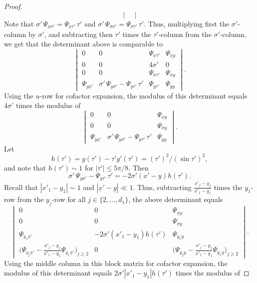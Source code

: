 \documentclass[leqno]{amsart}
\theoremstyle{definition}
\theoremstyle{remark}
\numberwithin{equation}{section}
\begin{document}
\begin{proof}
\[\begin{vmatrix}
\end{vmatrix}
\]
Note that $\sigma' \, \Psi_{\underline x\sigma'} = 
\Psi_{\underline x\tau'} \, \tau'$ and $\sigma' \, \Psi_{\sigma\sigma'} = 
\Psi_{\sigma\tau'} \, \tau'$.
Thus, multiplying first the $\sigma'$-column by $\sigma'$, and subtracting then $\tau'$ times the $\tau'$-column from the $\sigma'$-column, we get that the determinant above is comparable to
\[
\begin{vmatrix}
0 & 0 & \Psi_{\underline x\tau'} & \Psi_{\underline xy} \\
0 & 0 & 4 \sigma' & 0 \\
0 & 0 & \Psi_{\sigma \tau'} & \Psi_{\sigma y} \\
\Psi_{y\underline x'} & \sigma' \, \Psi_{y\sigma'} -\Psi_{y \tau'} \, \tau'& \Psi_{y \tau'} & \Psi_{y y}
\end{vmatrix}.
\]
Using the $u$-row for cofactor expansion, the modulus of this determinant equals $ 4 \sigma'$ times the modulus of
\[
\begin{vmatrix}
0 & 0 & \Psi_{\underline xy} \\
0 & 0 & \Psi_{\sigma y} \\
\Psi_{y\underline x'} & \sigma' \, \Psi_{y\sigma'} -\Psi_{y \tau'} \, \tau' & \Psi_{y y}
\end{vmatrix}.
\]
 Let 
 \begin{equation}\label{htau}
h(\tau') = g(\tau')-\tau' g'(\tau')=(\tau')^2/(\sin \tau')^2,
\end{equation}  
and note that $h(\tau')\sim 1$ for $|\tau'|\le 5\pi/8.$   Then
\[
\sigma' \, \Psi_{y\sigma'} -\Psi_{y \tau'} \, \tau'
 = -2\sigma'\left(x'-y\right)h(\tau').
\]
Recall that $|x'_1-y_1|\sim 1$ and $|\underline x'-\underline y|\ll 1$. Thus, subtracting $\tfrac{x'_j-y_j}{x'_1-y_1}$ times the $y_1$-row from the $y_j$-row for all $j\in \{2,\dots,d_1\}$, the above determinant equals
\[
\begin{vmatrix}
0 & 0 & \Psi_{\underline xy} \\
0 & 0 & \Psi_{\sigma y} \\
\Psi_{y_1\underline x'} & -2\sigma'\left(x'_1-y_1\right)h(\tau') & \Psi_{y_1 y} \\
\big(\Psi_{y_j\underline x'} -\tfrac{x'_j-y_j}{x'_1-y_1}\Psi_{y_1\underline x'}\big)_{j\ge 2} & 0 & \big(\Psi_{y_j y} -\tfrac{x'_j-y_j}{x'_1-y_1}\Psi_{y_1 y}\big)_{j\ge 2}
\end{vmatrix}.
\]
Using the  middle column in this block matrix for cofactor expansion, the modulus of this determinant equals $2\sigma'\left|x'_1-y_1\right|h(\tau')$ times the modulus of 

\end{proof}
\end{document}

